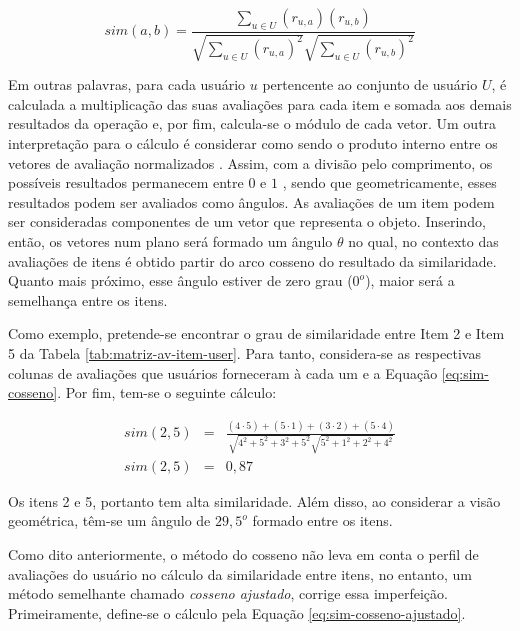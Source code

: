         \begin{equation} 
            sim(a, b) = \frac{\sum_{u\in U}(r_{u, a})(r_{u, b})}{\sqrt{\sum_{u\in U}(r_{u, a})^2}\sqrt{\sum_{u\in U}(r_{u, b})^2}} \label{eq:sim-cosseno}
        \end{equation}    
    
        Em outras palavras, para cada usuário $u$ pertencente ao conjunto de usuário $U$, é calculada a multiplicação das suas avaliações para cada item e somada aos demais resultados da operação e, por fim, calcula-se o módulo de cada vetor. Um outra interpretação para o cálculo é considerar como sendo o produto interno entre os vetores de avaliação normalizados \cite{Jones1987}. Assim, com a divisão pelo comprimento, os possíveis resultados permanecem entre $0$ e $1$ \cite{Jannach2010}, sendo que geometricamente, esses resultados podem ser avaliados como ângulos. As avaliações de um item podem ser consideradas componentes de um vetor que representa o objeto. Inserindo, então, os vetores num plano será formado um ângulo $\theta$ no qual, no contexto das avaliações de itens é obtido partir do arco cosseno do resultado da similaridade. Quanto mais próximo, esse ângulo estiver de zero grau ($0^o$), maior será a semelhança entre os itens.
        
        Como exemplo, pretende-se encontrar o grau de similaridade entre Item 2 e Item 5 da Tabela \ref{tab:matriz-av-item-user}. Para tanto, considera-se as respectivas colunas de avaliações que usuários forneceram à cada um e a Equação \ref{eq:sim-cosseno}. Por fim, tem-se o seguinte cálculo:
        
        \begin{eqnarray}
            sim(2, 5) &=& \frac{(4\cdot 5)+(5\cdot 1)+(3\cdot 2)+(5 \cdot 4)}{\sqrt{4^2+5^2+3^2+5^2}\sqrt{5^2+1^2+2^2+4^2}} \nonumber \\
            sim(2, 5) &=& 0,87 \nonumber
        \end{eqnarray}
        
        Os itens 2 e 5, portanto tem alta similaridade. Além disso, ao considerar a visão geométrica, têm-se um ângulo de $29,5^o$ formado entre os itens.
    
        Como dito anteriormente, o método do cosseno não leva em conta o perfil de avaliações do usuário no cálculo da similaridade entre itens, no entanto, um método semelhante chamado \textit{cosseno ajustado}, corrige essa imperfeição. Primeiramente, define-se o cálculo pela Equação \ref{eq:sim-cosseno-ajustado}.
        

